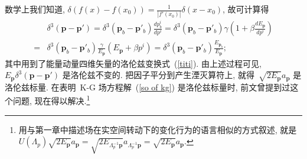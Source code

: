 数学上我们知道, $\delta(f(x)-f(x_0))=\frac{1}{|f'(x_0)|}\delta(x-x_0)$, 故可计算得
\begin{align}
&\delta^3(\bm{p}-\bm{p}')=\delta^3(\bm{p}_b-\bm{p}'_b)\frac{dp^i_b}{dp^i}=\delta^3(\bm{p}_b-\bm{p}'_b)\gamma(1+\beta\frac{dE_{\bm{p}}}{dp^i})\nonumber\\
=&\delta^3(\bm{p}_b-\bm{p}'_b)\frac{\gamma}{E_{\bm{p}}}(E_{\bm{p}}+\beta p^i)=\delta^3(\bm{p}_b-\bm{p}'_b)\frac{E_{\bm{p}_b}}{E_{\bm{p}}};
\end{align}
其中用到了能量动量四维矢量的洛伦兹变换式~(\ref{titi}). 由上述过程可见, $E_{\bm{p}}\delta^3(\bm{p}-\bm{p}')$ 是洛伦兹不变的. 把因子平分到产生湮灭算符上, 就得~$\sqrt{2E_{\bm{p}}}a_{\bm{p}}$ 是洛伦兹标量. 在表明~K-G 场方程解~(\ref{so of kg}) 是洛伦兹标量时, 前文曾提到过这个问题, 现在得以解决.\footnote{用与第一章中描述场在实空间转动下的变化行为的语言相似的方式叙述, 就是~$U(\Lambda_p)\sqrt{2E_{\bm{p}}}a_{\bm{p}}=\sqrt{2E_{\Lambda^{-1}_p\bm{p}}}a_{\Lambda^{-1}_p\bm{p}}=\sqrt{2E_{\bm{p}}}a_{\bm{p}}$.}%
%
%
%
%
